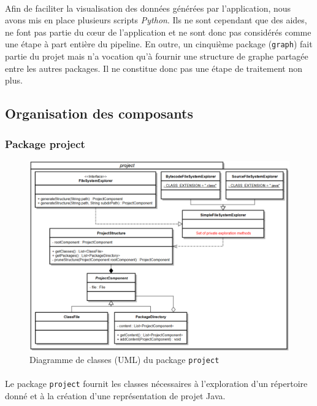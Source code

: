 \documentclass{scrartcl}
\begin{document}
    \paragraph{}Afin de faciliter la visualisation des données générées par l'application, nous avons mis en place plusieurs scripts \textit{Python}. Ils ne sont cependant que des aides, ne font pas partie du cœur de l'application et ne sont donc pas considérés comme une étape à part entière du pipeline. En outre, un cinquième package (\texttt{graph}) fait partie du projet mais n'a vocation qu'à fournir une structure de graphe partagée entre les autres packages. Il ne constitue donc pas une étape de traitement non plus.

\subsection{Organisation des composants}

\subsubsection{Package project}
    \begin{figure}[h!]
        \centering
        \includegraphics[width=\textwidth]{img/uml/project.png}
        \caption{Diagramme de classes (UML) du package \texttt{project}}
    \end{figure}
	\paragraph{}Le package \texttt{project} fournit les classes nécessaires à l'exploration d'un répertoire donné et à la création d'une représentation de projet Java.
\end{document}
